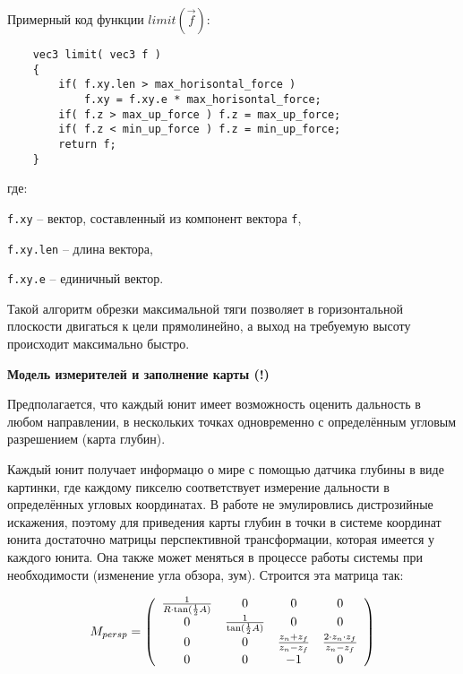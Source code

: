 \begin{verbatim}
\end{verbatim}


Примерный код функции $limit \left( \vec f \right)$:

\begin{verbatim}
    vec3 limit( vec3 f )
    {
        if( f.xy.len > max_horisontal_force )
            f.xy = f.xy.e * max_horisontal_force;
        if( f.z > max_up_force ) f.z = max_up_force;
        if( f.z < min_up_force ) f.z = min_up_force;
        return f;
    }
\end{verbatim}

где:

\verb|f.xy| -- вектор, составленный из компонент вектора \verb|f|,

\verb|f.xy.len| -- длина вектора,

\verb|f.xy.e| -- единичный вектор.

Такой алгоритм обрезки максимальной тяги позволяет в горизонтальной плоскости двигаться к цели прямолинейно,
а выход на требуемую высоту происходит максимально быстро.

\newpage
\textbf{Модель измерителей и заполнение карты (!)}

Предполагается, что каждый юнит имеет возможность
оценить дальность в любом направлении, в нескольких точках одновременно с определённым 
угловым разрешением (карта глубин).

Каждый юнит получает информацю о мире с помощью датчика глубины в виде картинки,
где каждому пикселю соответствует измерение дальности в определённых угловых координатах. В работе не эмулировлись
дистрозийные искажения, поэтому для приведения карты глубин в точки в системе координат юнита достаточно 
матрицы перспективной трансформации, которая имеется у каждого юнита. Она также может меняться в процессе работы
системы при необходимости (изменение угла обзора, зум). Строится эта матрица так:

$$
M_{persp} = \left( \begin{array}{c c c c}
        \frac{1}{ R \cdot \tan( \frac{1}{2} A ) } & 0 & 0 & 0 \\
        0 & \frac{1}{ \tan( \frac{1}{2} A ) } & 0 & 0 \\
        0 & 0 & \frac{ z_{n} + z_{f} }{ z_{n}-z_{f} } & \frac{ 2 \cdot z_{n} \cdot z_{f} }{ z_{n} - z_{f} } \\
        0 & 0 & -1 & 0
\end{array} \right)
$$

